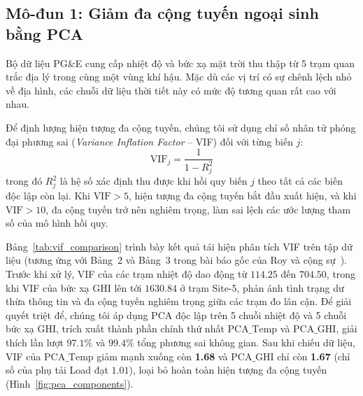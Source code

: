 \subsection{Mô-đun 1: Giảm đa cộng tuyến ngoại sinh bằng PCA}
\label{subsec:module1}

Bộ dữ liệu PG\&E cung cấp nhiệt độ và bức xạ mặt trời thu thập từ 5 trạm quan trắc địa lý trong cùng một vùng khí hậu. Mặc dù các vị trí có sự chênh lệch nhỏ về địa hình, các chuỗi dữ liệu thời tiết này có mức độ tương quan rất cao với nhau.

Để định lượng hiện tượng đa cộng tuyến, chúng tôi sử dụng chỉ số nhân tử phóng đại phương sai (\textit{Variance Inflation Factor} -- VIF) đối với từng biến $j$:
\begin{equation}
    \text{VIF}_j = \frac{1}{1 - R_j^2}
\end{equation}
trong đó $R_j^2$ là hệ số xác định thu được khi hồi quy biến $j$ theo tất cả các biến độc lập còn lại. Khi $\text{VIF} > 5$, hiện tượng đa cộng tuyến bắt đầu xuất hiện, và khi $\text{VIF} > 10$, đa cộng tuyến trở nên nghiêm trọng, làm sai lệch các ước lượng tham số của mô hình hồi quy.

Bảng~\ref{tab:vif_comparison} trình bày kết quả tái hiện phân tích VIF trên tập dữ liệu (tương ứng với Bảng~2 và Bảng~3 trong bài báo gốc của Roy và cộng sự~\cite{roy2025hourly}). Trước khi xử lý, VIF của các trạm nhiệt độ dao động từ $114.25$ đến $704.50$, trong khi VIF của bức xạ GHI lên tới $1630.84$ ở trạm Site-5, phản ánh tình trạng dư thừa thông tin và đa cộng tuyến nghiêm trọng giữa các trạm đo lân cận. Để giải quyết triệt để, chúng tôi áp dụng PCA độc lập trên 5 chuỗi nhiệt độ và 5 chuỗi bức xạ GHI, trích xuất thành phần chính thứ nhất $\text{PCA\_Temp}$ và $\text{PCA\_GHI}$, giải thích lần lượt $97.1\%$ và $99.4\%$ tổng phương sai không gian. Sau khi chiếu dữ liệu, VIF của $\text{PCA\_Temp}$ giảm mạnh xuống còn \textbf{1.68} và $\text{PCA\_GHI}$ chỉ còn \textbf{1.67} (chỉ số của phụ tải Load đạt $1.01$), loại bỏ hoàn toàn hiện tượng đa cộng tuyến (Hình~\ref{fig:pca_components}).

